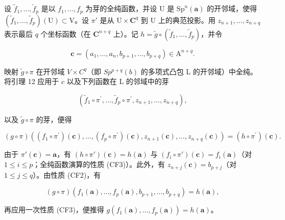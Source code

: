 设 \(\widetilde{f}_1, \ldots, \widetilde{f}_p\) 是以 \(f_1, \ldots, f_p\) 为芽的全纯函数，并设 U 是 \(\mathrm{Sp}^n(\boldsymbol{a})\) 的开邻域，使得 \((\widetilde{f}_1, \ldots, \widetilde{f}_p)(\mathrm{U}) \subset \mathrm{V}\)。设 \(\pi'\) 是从 \(\mathrm{U} \times \mathbf{C}^q\) 到 U 上的典范投影。用 \(z_{n+1}, \ldots, z_{n+q}\) 表示最后 \(q\) 个坐标函数（在 \(\mathbf{C}^{n+q}\) 上）。记 \(h = \widetilde{g} \circ (\widetilde{f}_1, \ldots, \widetilde{f}_p)\)，并令

\[
\boldsymbol {c} = (a _ {1}, \dots , a _ {n}, b _ {p + 1}, \dots , b _ {p + q}) \in \mathrm{A} ^ {n + q}.
\]

映射 \(\widetilde{g} \circ \pi\) 在开邻域 \(V \times C^q\)（即 \(Sp^{p+q}(b)\) 的多项式凸包 L 的开邻域）中全纯。将引理 12 应用于 \(c\) 以及下列函数在 L 的邻域中的芽

\[
(\widetilde {f} _ {1} \circ \pi^ {\prime}, \ldots , \widetilde {f} _ {p} \circ \pi^ {\prime}, z _ {n + 1}, \ldots , z _ {n + q}),
\]

以及 \(\widetilde{g}\circ\pi\) 的芽，便得

\[
(g \circ \pi) \left((f _ {1} \circ \pi^ {\prime}) (\boldsymbol {c}), \dots , (f _ {p} \circ \pi^ {\prime}) (\boldsymbol {c}), z _ {n + 1} (\boldsymbol {c}), \dots , z _ {n + q} (\boldsymbol {c})\right) = (h \circ \pi^ {\prime}) (\boldsymbol {c}).
\]

由于 \(\pi'(\boldsymbol{c}) = \boldsymbol{a}\)，有 \((h \circ \pi')(\boldsymbol{c}) = h(\boldsymbol{a})\) 与 \((f_i \circ \pi')(\boldsymbol{c}) = f_i(\boldsymbol{a})\)（对 \(1 \leqslant i \leqslant p\)；全纯函数演算的性质 (CF3)）。此外，有 \(z_{n+j}(\boldsymbol{c}) = b_{p+j}\)（对 \(1 \leqslant j \leqslant q\)）。由性质 (CF2)，有

\[
(g \circ \pi) (f _ {1} (\boldsymbol {a}), \dots , f _ {p} (\boldsymbol {a}), b _ {p + 1}, \dots , b _ {p + q}) = h (\boldsymbol {a}),
\]

再应用一次性质 (CF3)，便推得 \(g(f_{1}(\boldsymbol{a}), \ldots, f_{p}(\boldsymbol{a})) = h(\boldsymbol{a})\)。

